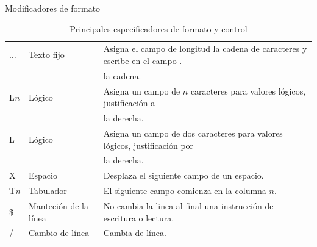 \begin{frame}[fragile]{Modificadores de formato}
\begin{table}[]
{\begin{tabular}{|l|l|l|}
        $\ldots$        & Texto fijo                        & Asigna el campo de longitud la cadena de caracteres y escribe en el campo .   \\
                        &                                   & la cadena.                                                                    \\ \hline
        L\textit{n}     & Lógico                            & Asigna un campo de $n$ caracteres para valores lógicos, justificación a       \\ 
                        &                                   & la derecha.                                                                   \\ \hline
        L               & Lógico                            & Asigna un campo de dos caracteres para valores lógicos, justificación por     \\ \hline 
                        &                                   & la derecha.                                                                   \\ \hline 
        X               & Espacio                           & Desplaza el siguiente campo de un espacio.                                    \\ \hline
        T\textit{n}     & Tabulador                         & El siguiente campo comienza en la columna $n$.                                \\ \hline
        \$              & Manteción de la línea             & No cambia la linea al final una instrucción de escritura o lectura.           \\ \hline
        /               & Cambio de línea                   & Cambia de línea.                                                              \\ \hline
      \end{tabular}}
          \caption*{Principales especificadores de formato y control}          
    \end{table}
\end{frame}


